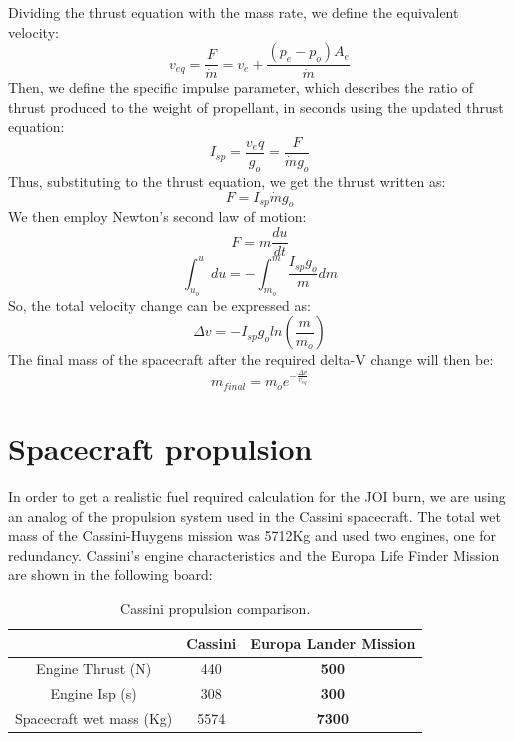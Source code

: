Dividing the thrust equation with the mass rate, we define the equivalent velocity:
\begin{equation}
v_{eq}=\frac{F}{\dot{m}}=v_e+\frac{(p_e-p_o) A_e}{\dot{m}}
\end{equation}
Then, we define the specific impulse parameter, which describes the ratio of thrust produced to the weight of propellant, in seconds using the updated thrust equation:
\begin{equation}
I_{sp}=\frac{v_eq}{g_o} =\frac{F}{\dot{m}g_o}
\end{equation}
Thus, substituting to the thrust equation, we get the thrust written as:
\begin{equation}
F=I_{sp}\dot{m}g_o
\end{equation}
We then employ Newton’s second law of motion:
\begin{equation}
F=m\frac{du}{dt}
\end{equation}
\begin{equation}
\int_{u_o}^{u}du=-\int_{m_o}^{m}\frac{I_{sp}g_o}{m}dm
\end{equation}
So, the total velocity change can be expressed as:
\begin{equation}
\Delta v=-I_{sp}g_o ln(\frac{m}{m_o})
\end{equation}
The final mass of the spacecraft after the required delta-V change will then be:
\begin{equation}
m_{final}=m_{o}e^{-\frac{\Delta v}{v_{eq}}}
\end{equation}
\section{Spacecraft propulsion}
In order to get a realistic fuel required calculation for the JOI burn, we are using an analog of the propulsion system used in the Cassini spacecraft. The total wet mass of the Cassini-Huygens mission was 5712Kg \cite{cassini} and used two engines, one for redundancy.
Cassini's engine characteristics and the Europa Life Finder Mission are shown in the following board:

\begin{table}[htb!]
  \centering
    \begin{tabular}{|c|c|c|}
    \hline
          & \textbf{Cassini} & \textbf{Europa Lander Mission} \bigstrut\\
    \hline
    Engine Thrust (N) & 440   & \textbf{500} \bigstrut\\
    \hline
    Engine Isp (s) & 308   & \textbf{300} \bigstrut\\
    \hline
    Spacecraft wet mass (Kg) & 5574  & \textbf{7300} \bigstrut\\
    \hline
    \end{tabular}%
    \caption{Cassini propulsion comparison.\cite{cassini}}
  \label{tab:propulsion}%
\end{table}%

